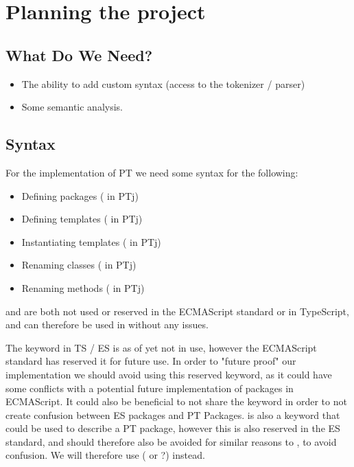 
\chapter{Planning the project}\label{ch:planning-the-project}

\section{What Do We Need?}\label{sec:what-do-we-need}

\begin{itemize}
    \item The ability to add custom syntax (access to the tokenizer / parser)
    \item Some semantic analysis.
\end{itemize}

\section{Syntax}\label{sec:syntax}

For the implementation of PT we need some syntax for the following:

\begin{itemize}
    \item Defining packages ( in PTj)
    \item Defining templates ( in PTj)
    \item Instantiating templates ( in PTj)
    \item Renaming classes (\codeword{=>} in PTj)
    \item Renaming methods (\codeword{->} in PTj)
\end{itemize}

 and  are both not used or reserved in the ECMAScript standard or in TypeScript, and can therefore be used in \languagename without any issues.

The keyword  in TS / ES is as of yet not in use, however the ECMAScript standard has reserved it for future use.
In order to "future proof" our implementation we should avoid using this reserved keyword, as it could have some conflicts with a potential future implementation of packages in ECMAScript.
It could also be beneficial to not share the keyword in order to not create confusion between ES packages and PT Packages.
 is also a keyword that could be used to describe a PT package, however this is also reserved in the ES standard, and should therefore also be avoided for similar reasons to , to avoid confusion.
We will therefore use ( or ?) instead. %

